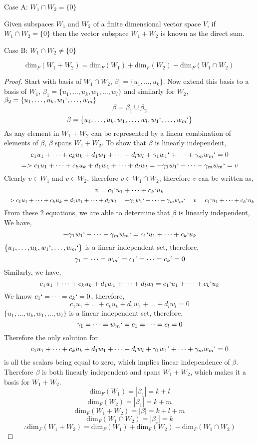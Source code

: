 \documentclass[11pt,a4paper]{colorart}
\def\l{\left}
\def\r{\right}
\def\b{\beta}
\def\g{\gamma}
\begin{document}
Case A: $W_1 \cap W_2 = \{0\}$\\

\begin{definition}
	Given subspaces $W_1$ and $W_2$ of a finite dimensional vector space $V$, if $W_1 \cap W_2 = \{0\}$ then the vector subspace $W_1 + W_2$ is known as the direct sum.
\end{definition}

Case B: $W_1 \cap W_2 \neq \{0\}$

\[ \text{dim}_F\l(W_1 +W_2 \r) = \text{dim}_F\l( W_1 \r) + \text{dim}_F\l(W_2 \r) - \text{dim}_F\l( W_1\cap W_2\r) \]

\begin{proof}
	Start with basis of $W_1\cap W_2$, $\b_\circ = \{u_1,\dots,u_k\}$. Now extend this basis to a basis of $W_1$, $\b_1 = \{u_1,\dots,u_k,w_1,\dots,w_l\}$ and similarly for $W_2$, $\b_2 = \{u_1,\dots,u_k,w_1`,\dots,w_m\}$
	\[\b = \b_1 \cup \b_2 \]
	\[\b =  \{u_1,\dots,u_k,w_1,\dots,w_l,w_1`,\dots,w_m`\}\]
	As any element in $W_1 + W_2$ can be represented by a linear combination of elements of $\b$, $\b$ spans $W_1+W_2$. To show that $\b$ is linearly independent,
	\[ c_1 u_1 + \dots + c_k u_k + d_1 w_1 + \dots + d_l w_l + \g_1 w_1` + \dots + \g_m w_m` = 0 \]
	\[ => c_1 u_1 + \dots + c_k u_k + d_1 w_1 + \dots + d_l w_l = - \g_1 w_1` - \dots - \g_m w_m` = v \] 
	Clearly $v\in W_1$ and $v\in W_2$, therefore $v \in W_1 \cap W_2$, therefore $v$ can be written as,
	\[ v = c_1` u_1 + \dots + c_k` u_k \]
	\[ => c_1 u_1 + \dots + c_k u_k + d_1 w_1 + \dots + d_l w_l = - \g_1 w_1` - \dots - \g_m w_m` = v = c_1` u_1 + \dots + c_k` u_k \]
	From these 2 equations, we are able to determine that $\b$ is linearly independent,\\
	We have,
	\[ - \g_1 w_1` - \dots - \g_m w_m`  = c_1` u_1 + \dots + c_k` u_k \]
	$\{u_1,\dots,u_k,w_1`,\dots,w_m`\}$ is a linear independent set, therefore,
	\[  \g_1 = \dots = w_m`  = c_1` = \dots = c_k` = 0 \]
	Similarly, we have,
	\[ c_1 u_1 + \dots + c_k u_k + d_1 w_1 + \dots + d_l w_l = c_1` u_1 + \dots + c_k` u_k \]
	We know $c_1` = \dots = c_k` = 0$, therefore,
	\[ c_1 u_1 + \dots + c_k u_k + d_1 w_1 + \dots + d_l w_l = 0 \]
	$\{u_1,\dots,u_k,w_1,\dots,w_l\}$ is a linear independent set, therefore,
	\[  \g_1 = \dots = w_m`  = c_1 = \dots = c_l = 0 \]
	Therefore the only solution for
	\[ c_1 u_1 + \dots + c_k u_k + d_1 w_1 + \dots + d_l w_l + \g_1 w_1` + \dots + \g_m w_m` = 0 \]
	is all the scalars being equal to zero, which implies linear independence of $\b$. Therefore $\b$ is both linearly independent and spans $W_1+W_2$, which makes it a basis for $W_1+W_2$.
	\[ \text{dim}_F\l( W_1 \r) = |\b_1| = k + l \]
	\[ \text{dim}_F\l( W_2 \r) = |\b_1| = k + m \]
	\[ \text{dim}_F\l( W_1 + W_2 \r) = |\b| = k + l + m \]
	\[ \text{dim}_F\l( W_1 \cap W_2 \r) = |\b_\circ| = k  \]
	\[ \therefore\text{dim}_F\l(W_1 +W_2 \r) = \text{dim}_F\l( W_1 \r) + \text{dim}_F\l(W_2 \r) - \text{dim}_F\l( W_1\cap W_2\r) \]
\end{proof}
\end{document}
